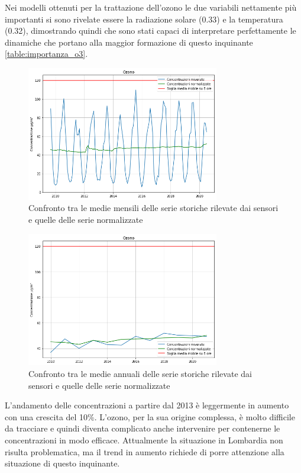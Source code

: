 \documentclass[a4paper]{report}
\begin{document}
Nei modelli ottenuti per la trattazione dell'ozono le due variabili nettamente più importanti si sono rivelate essere la radiazione solare (0.33) e la temperatura (0.32), dimostrando quindi che sono stati capaci di interpretare perfettamente le dinamiche che portano alla maggior formazione di questo inquinante \ref{table:importanza_o3}.

\begin{figure}[h]
\centering
\includegraphics[width=0.75\textwidth]{o3_medie_mensili}
\caption{Confronto tra le medie mensili delle serie storiche rilevate dai sensori e quelle delle serie normalizzate}
\label{fig:o3_medie_mensili}
\end{figure}

\begin{figure}[h]
\centering
\includegraphics[width=0.75\textwidth]{o3_medie_annuali}
\caption{Confronto tra le medie annuali delle serie storiche rilevate dai sensori e quelle delle serie normalizzate}
\label{fig:o3_medie_annuali}
\end{figure}

L'andamento delle concentrazioni a partire dal 2013 è leggermente in aumento con una crescita del 10\%. L'ozono, per la sua origine complessa, è molto difficile da tracciare e quindi diventa complicato anche intervenire per contenerne le concentrazioni in modo efficace. Attualmente la situazione in Lombardia non risulta problematica, ma il trend in aumento richiede di porre attenzione alla situazione di questo inquinante.
\end{document}
